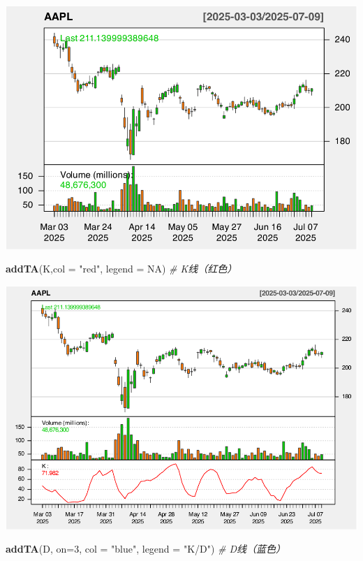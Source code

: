 \documentclass[]{ctexbook}
\newenvironment{Shaded}{\begin{snugshade}}{\end{snugshade}}
\newcommand{\AttributeTok}[1]{\textcolor[rgb]{0.13,0.29,0.53}{#1}}
\newcommand{\CommentTok}[1]{\textcolor[rgb]{0.56,0.35,0.01}{\textit{#1}}}
\newcommand{\ConstantTok}[1]{\textcolor[rgb]{0.56,0.35,0.01}{#1}}
\newcommand{\DecValTok}[1]{\textcolor[rgb]{0.00,0.00,0.81}{#1}}
\newcommand{\FunctionTok}[1]{\textcolor[rgb]{0.13,0.29,0.53}{\textbf{#1}}}
\newcommand{\NormalTok}[1]{#1}
\newcommand{\StringTok}[1]{\textcolor[rgb]{0.31,0.60,0.02}{#1}}
\begin{document}
\includegraphics[width=0.9\linewidth]{quantmod_files/figure-latex/kdj-1}

\begin{Shaded}
\begin{Highlighting}[]
\FunctionTok{addTA}\NormalTok{(K,}\AttributeTok{col =} \StringTok{"red"}\NormalTok{, }\AttributeTok{legend =} \ConstantTok{NA}\NormalTok{)    }\CommentTok{\# K线（红色）}
\end{Highlighting}
\end{Shaded}

\includegraphics[width=0.9\linewidth]{quantmod_files/figure-latex/kdj-2}

\begin{Shaded}
\begin{Highlighting}[]
\FunctionTok{addTA}\NormalTok{(D, }\AttributeTok{on=}\DecValTok{3}\NormalTok{, }\AttributeTok{col =} \StringTok{"blue"}\NormalTok{, }\AttributeTok{legend =} \StringTok{"K/D"}\NormalTok{)   }\CommentTok{\# D线（蓝色）}
\end{Highlighting}
\end{Shaded}
\end{document}
